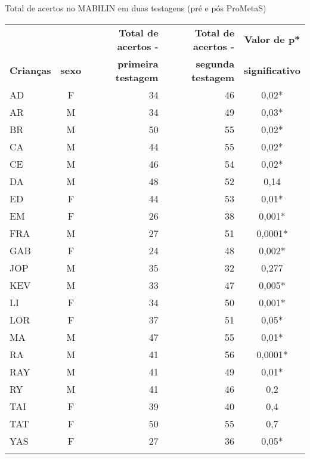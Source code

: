\documentclass[output=paper,colorlinks,citecolor=brown,booklanguage=portuguese]{langscibook}
\begin{document}
\begin{Tabela}[H]
\caption{{Total de acertos no MABILIN em duas testagens (pré e pós ProMetaS)}}
\label{tab:cap14tab1}


\begin{tabular}{lcrrS}
\lsptoprule
&& \textbf{Total de acertos -} & \textbf{Total de acertos -} & \textbf{Valor de p*}\\
\textbf{Crianças} & \textbf{sexo} & \textbf{primeira testagem} & \textbf{segunda testagem}& \textbf{significativo}\\
\lsptoprule
AD & F&	34&	46&0,02*\\
\addlinespace
AR&M&	34&	49&0,03*\\
\addlinespace
BR & M&	50	&55	&0,02*\\
\addlinespace
CA & M&	44&	55&0,02*\\
\addlinespace
CE & M&	46&	54&0,02*\\
\addlinespace
DA & M&	48&	52&0,14\\
\addlinespace
ED & F& 	44&	53&0,01*\\
\addlinespace
EM & F&	26&	38&0,001*\\
\addlinespace
FRA& M&	27&	51&0,0001*\\
\addlinespace
GAB & F& 	24&	48&0,002*\\
\addlinespace
JOP & M&	35&	32&0,277\\
\addlinespace
KEV&M&	33	&47&0,005*\\
\addlinespace
LI & F&	34&	50&0,001*\\
\addlinespace
LOR & F&	37&	51& 0,05*\\
\addlinespace
MA & M&	47&	55&0,01*\\
\addlinespace
RA & M&	41&	56&0,0001*\\
\addlinespace
RAY&M&	41&	49&0,01*\\
\addlinespace
RY & M&	41&	46&0,2\\
\addlinespace
TAI & F&	39&	40&0,4\\
\addlinespace
TAT & F&	50&	55&0,7\\
\addlinespace
YAS & F&	27&	36&0,05*\\
\addlinespace
\lspbottomrule
\end{tabular}
\end{Tabela}
\end{document}
